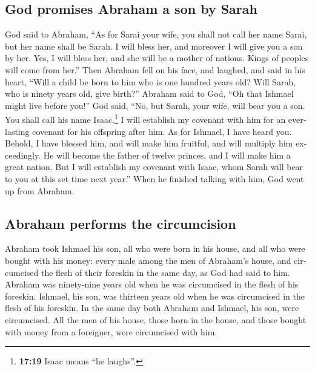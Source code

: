 \begin{paracol}{2}
\begin{otherlanguage}{english}
\hypertarget{god-promises-abraham-a-son-by-sarah}{%
\subsection{God promises Abraham a son by
Sarah}\label{god-promises-abraham-a-son-by-sarah}}

 God said to Abraham, ``As for Sarai your wife, you shall
not call her name Sarai, but her name shall be Sarah.  I
will bless her, and moreover I will give you a son by her. Yes, I will
bless her, and she will be a mother of nations. Kings of peoples will
come from her.''  Then Abraham fell on his face, and
laughed, and said in his heart, ``Will a child be born to him who is one
hundred years old? Will Sarah, who is ninety years old, give birth?''
 Abraham said to God, ``Oh that Ishmael might live before
you!''  God said, ``No, but Sarah, your wife, will bear
you a son. You shall call his name Isaac.\footnote{\textbf{17:19} Isaac
  means ``he laughs''.} I will establish my covenant with him for an
everlasting covenant for his offspring after him.  As for
Ishmael, I have heard you. Behold, I have blessed him, and will make him
fruitful, and will multiply him exceedingly. He will become the father
of twelve princes, and I will make him a great nation. 
But I will establish my covenant with Isaac, whom Sarah will bear to you
at this set time next year.''  When he finished talking
with him, God went up from Abraham.

\hypertarget{abraham-performs-the-circumcision}{%
\subsection{Abraham performs the
circumcision}\label{abraham-performs-the-circumcision}}

 Abraham took Ishmael his son, all who were born in his
house, and all who were bought with his money: every male among the men
of Abraham's house, and circumcised the flesh of their foreskin in the
same day, as God had said to him.  Abraham was
ninety-nine years old when he was circumcised in the flesh of his
foreskin.  Ishmael, his son, was thirteen years old when
he was circumcised in the flesh of his foreskin.  In the
same day both Abraham and Ishmael, his son, were circumcised.
 All the men of his house, those born in the house, and
those bought with money from a foreigner, were circumcised with him.


\end{otherlanguage}
\end{paracol}
